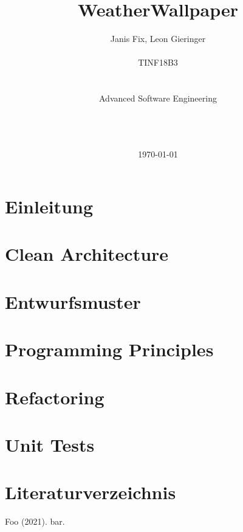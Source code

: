 \documentclass[11pt,a4paper]{article}
\title{WeatherWallpaper\vspace{20px}}
\author{Janis Fix, Leon Gieringer \\ \\ TINF18B3 \\ \\ \\ Advanced Software Engineering \\ \\ \\ \\}
\date{\today}
\begin{document}
	\maketitle
	\thispagestyle{empty}
	\newpage
	
	\tableofcontents
	\newpage
	
	
	\pagestyle{fancy}
	\fancyhf{}
	\setlength{\headheight}{35pt}
	\cfoot{\thepage}
	\newpage
	
	
	\section{Einleitung}
	
	\newpage
	
	\section{Clean Architecture}
	
	\section{Entwurfsmuster}
	
	\section{Programming Principles}
	
	\section{Refactoring}
	
	\section{Unit Tests}
	
	
	
	

	\newpage
	\section*{Literaturverzeichnis}
	\begin{itemize}
		 Foo (2021). bar.
	\end{itemize}
	
\end{document}
